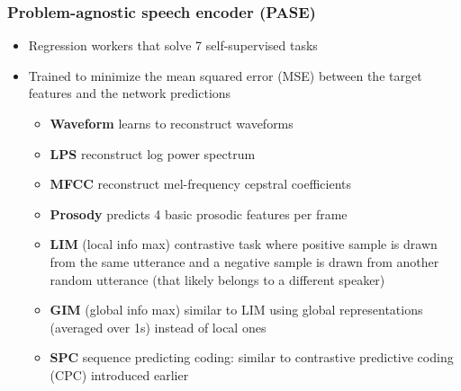 \documentclass[table]{beamer}
\begin{document}
\begin{frame}
\frametitle{Problem-agnostic speech encoder (PASE)}

		\begin{itemize}
			\item Regression workers that solve 7 self-supervised tasks
			\item Trained to minimize the mean squared error (MSE) between the target features and the network predictions 
			\begin{itemize}
				\item \textbf{Waveform} learns to reconstruct waveforms
				\item \textbf{LPS} reconstruct log power spectrum 
				\item \textbf{MFCC} reconstruct  mel-frequency cepstral coefficients
				\item \textbf{Prosody} predicts 4 basic prosodic features per frame
				\item \textbf{LIM} (local info max) contrastive task where positive sample is drawn from the same utterance and a negative sample is drawn from another random utterance (that likely belongs to a different speaker)
				\item  \textbf{GIM} (global info max)  similar to LIM using global representations (averaged over 1s) instead of local ones
				\item \textbf{SPC} sequence predicting coding: similar to contrastive predictive coding (CPC) introduced earlier
			\end{itemize}
		\end{itemize} 




\end{frame}

\end{document}
